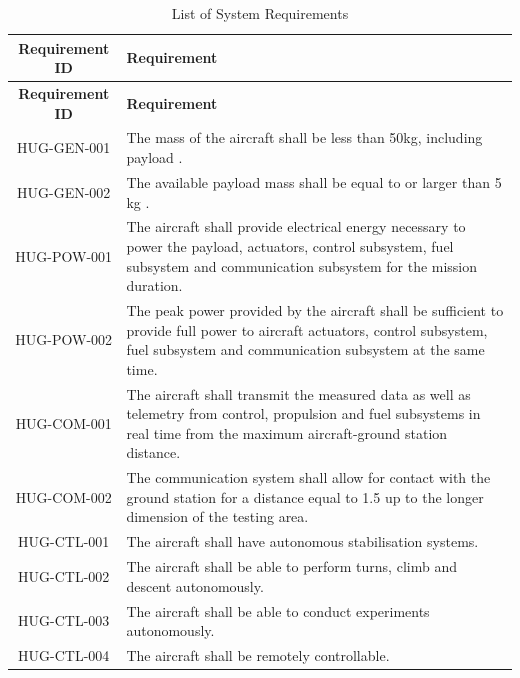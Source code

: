 \begin{longtable}{|c|p{13cm}|}
\caption{List of System Requirements}
\label{tab:system_requirements} \\
\hline
\textbf{Requirement ID} & \textbf{Requirement} \\
\hline
\endfirsthead

\hline
\textbf{Requirement ID} & \textbf{Requirement} \\
\hline
\endhead

HUG-GEN-001& The mass of the aircraft shall be less than 50kg, including payload \cite{Castro2026}. \\ \hline

HUG-GEN-002 & The available payload mass shall be equal to or larger than 5 kg \cite{Castro2026}. \\ \hline



HUG-POW-001& The aircraft shall provide electrical energy necessary to power the payload, actuators, control subsystem, fuel subsystem and communication subsystem for the mission duration.\\ \hline 

HUG-POW-002& The peak power provided by the aircraft shall be sufficient to provide full power to aircraft actuators, control subsystem, fuel subsystem and communication subsystem at the same time.\\ \hline 

HUG-COM-001 & The aircraft shall transmit the measured data as well as telemetry from control, propulsion and fuel subsystems in real time from the maximum aircraft-ground station distance.\\ \hline

HUG-COM-002 & The communication system shall allow for contact with the ground station for a distance equal to 1.5 up to the longer dimension of the testing area. \\ \hline


HUG-CTL-001& The aircraft shall have autonomous stabilisation systems.\\ \hline

HUG-CTL-002& The aircraft shall be able to perform turns, climb and descent autonomously.\\ \hline

HUG-CTL-003& The aircraft shall be able to conduct experiments autonomously.\\ \hline

HUG-CTL-004& The aircraft shall be remotely controllable. \\ \hline


\end{longtable}

